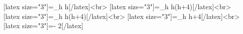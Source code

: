 [latex size="3"]=\lim_{h} {h}[/latex]<br>
[latex size="3"]=\lim_{h} {h(h+4)}[/latex]<br>
[latex size="3"]=\lim_{h} {h(h+4)}[/latex]<br>
[latex size="3"]=\lim_{h} {h+4}[/latex]<br>
[latex size="3"]=- {2}[/latex]
